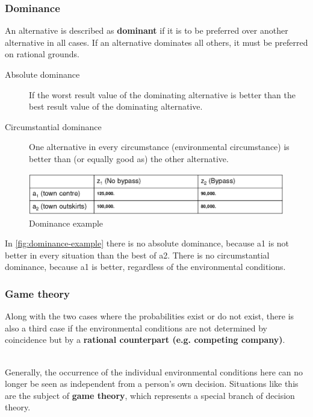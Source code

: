 \subsubsection{Dominance}
An alternative is described as \textbf{dominant} if it is to be
preferred over another alternative in all cases. If an alternative
dominates all others, it must be preferred on rational grounds.

\begin{description}
	\item[Absolute dominance] If the worst result value of the dominating
	alternative is better than the best result value of the dominating
	alternative.
	\item[Circumstantial dominance] One alternative in every circumstance
	(environmental circumstance) is better than (or equally good as) the
	other alternative.
\end{description}

\begin{figure}[H]
	\centering
	\includegraphics[width=\textwidth]{figures/absoluteDominance.png}
	\caption{Dominance example}
	\label{fig:dominance-example}
\end{figure}

In \autoref{fig:dominance-example} there is no absolute dominance, because a1 is
not better in every situation than the best of a2. There is no circumstantial
dominance, because a1 is better, regardless of the environmental conditions.

\subsubsection{Game theory}

Along with the two cases where the probabilities exist or do not exist, there
is also a third case if the environmental conditions are not determined by
coincidence but by a \textbf{rational counterpart (e.g. competing company)}.

\mbox{}\\
Generally, the occurrence of the individual environmental conditions here
can no longer be seen as independent from a person's own decision.
Situations like this are the subject of \textbf{game theory}, which represents a
special branch of decision theory.

